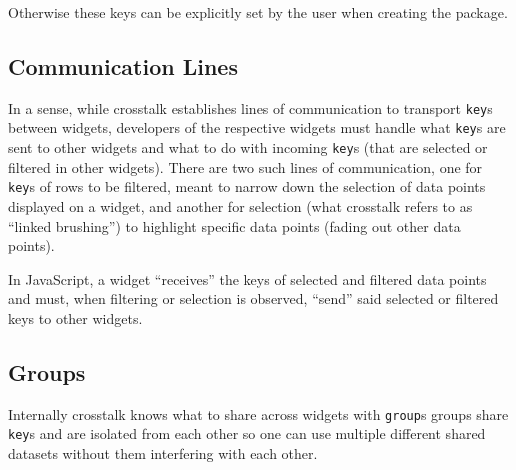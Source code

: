 \documentclass[10pt,]{krantz}
\makeatletter
\newenvironment{Shaded}{\begin{snugshade}}{\end{snugshade}}
\newcommand{\CommentTok}[1]{\textcolor[rgb]{0.37,0.37,0.37}{\textit{#1}}}
\newcommand{\DataTypeTok}[1]{\textcolor[rgb]{0.27,0.27,0.27}{#1}}
\newcommand{\DecValTok}[1]{\textcolor[rgb]{0.06,0.06,0.06}{#1}}
\newcommand{\KeywordTok}[1]{\textcolor[rgb]{0.27,0.27,0.27}{\textbf{#1}}}
\newcommand{\NormalTok}[1]{#1}
\newcommand{\OperatorTok}[1]{\textcolor[rgb]{0.43,0.43,0.43}{\textbf{#1}}}
\newcommand{\StringTok}[1]{\textcolor[rgb]{0.5,0.5,0.5}{#1}}
\newenvironment{kframe}{%
\medskip{}
\setlength{\fboxsep}{.8em}
 \def\at@end@of@kframe{}%
 \ifinner\ifhmode%
  \def\at@end@of@kframe{\end{minipage}}%
  \begin{minipage}{\columnwidth}%
 \fi\fi%
 \def\FrameCommand##1{\hskip\@totalleftmargin \hskip-\fboxsep
 \colorbox{shadecolor}{##1}\hskip-\fboxsep
     \hskip-\linewidth \hskip-\@totalleftmargin \hskip\columnwidth}%
 \MakeFramed {\advance\hsize-\width
   \@totalleftmargin\z@ \linewidth\hsize
   \@setminipage}}%
 {\par\unskip\endMakeFramed%
 \at@end@of@kframe}
\renewenvironment{Shaded}{\begin{kframe}}{\end{kframe}}
\makeatother
\begin{document}
Otherwise these keys can be explicitly set by the user when creating the package.

\begin{Shaded}
\end{Shaded}

\hypertarget{linking-widgets-communication-lines}{%
\subsection{Communication Lines}\label{linking-widgets-communication-lines}}

In a sense, while crosstalk establishes lines of communication to transport \texttt{key}s between widgets, developers of the respective widgets must handle what \texttt{key}s are sent to other widgets and what to do with incoming \texttt{key}s (that are selected or filtered in other widgets). There are two such lines of communication, one for \texttt{key}s of rows to be filtered, meant to narrow down the selection of data points displayed on a widget, and another for selection (what crosstalk refers to as ``linked brushing'') to highlight specific data points (fading out other data points).

In JavaScript, a widget ``receives'' the keys of selected and filtered data points and must, when filtering or selection is observed, ``send'' said selected or filtered keys to other widgets.

\hypertarget{linking-widgets-groups}{%
\subsection{Groups}\label{linking-widgets-groups}}

Internally crosstalk knows what to share across widgets with \texttt{group}s groups share \texttt{key}s and are isolated from each other so one can use multiple different shared datasets without them interfering with each other.
\end{document}
